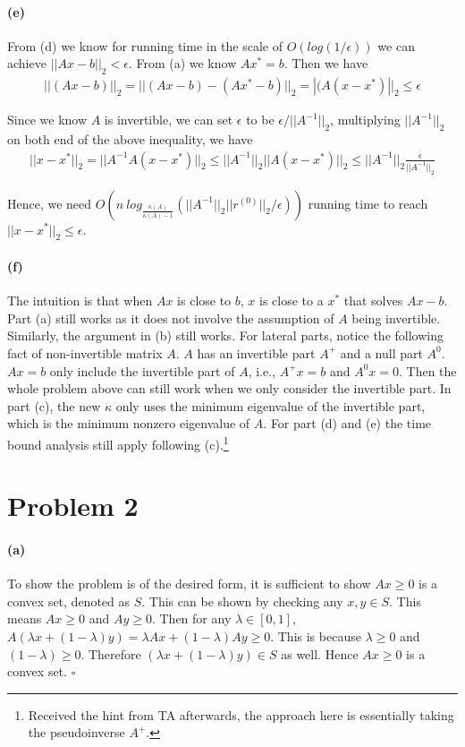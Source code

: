 \documentclass[12pt]{article}
\begin{document}
\paragraph{(e)} From (d) we know for running time in the scale of $O(log(1/\epsilon))$ we can achieve $||Ax -b ||_2 < \epsilon$. From (a) we know $Ax^* = b $. Then we have 
\begin{align*}
||(Ax -b) ||_2 = ||(Ax -b) - (Ax^* -b)||_2 = |(A (x - x^*) ||_2 \leq \epsilon
\end{align*}

Since we know $A$ is invertible, we can set $\epsilon$ to be $\epsilon / ||A^{-1}||_2$, multiplying $||A^{-1}||_2$ on both end of the above inequality, we have 
\begin{align*}
||x - x^* ||_2 = ||A^{-1}A (x - x^*) ||_2 \leq ||A^{-1}||_2 ||A (x - x^*) ||_2 \leq ||A^{-1}||_2 \frac{\epsilon}{||A^{-1}||_2}
\end{align*}

Hence, we need $O(n\:log_{\frac{\kappa(A)}{\kappa(A) - 1}}(||A^{-1}||_2||r^{(0)}||_2/\epsilon))$ running time to reach $||x - x^* ||_2  \leq \epsilon$.

\paragraph{(f)} The intuition is that when $Ax$ is close to $b$, $x$ is close to a $x^*$ that solves $Ax - b$. Part (a) still works as it does not involve the assumption of $A$ being invertible. Similarly, the argument in (b) still works. For lateral parts, notice the following fact of non-invertible matrix $A$. $A$ has an invertible part $A^{+}$ and a null part $A^{0}$. $Ax = b$ only include the invertible part of $A$, i.e., $A^{+}x = b$ and $A^{0}x = 0$. Then the whole problem above can still work when we only consider the invertible part. In part (c), the new $\kappa$ only uses the minimum eigenvalue of the invertible part, which is the minimum nonzero eigenvalue of $A$. For part (d) and (e) the time bound analysis still apply following (c).\footnote{Received the hint from TA afterwards, the approach here is essentially taking the pseudoinverse $A^+$.}

\newpage
\section*{Problem 2}
\paragraph{(a)} To show the problem is of the desired form, it is sufficient to show $Ax \geq 0$ is a convex set, denoted as $S$. This can be shown by checking any $x, y \in S$. This means $Ax \geq 0$ and $Ay \geq 0$. Then for any $\lambda \in [0,1]$, $A (\lambda x + (1-\lambda)y) = \lambda Ax + (1-\lambda)Ay \geq 0.$ This is because $\lambda \geq 0$ and $(1-\lambda) \geq 0$. Therefore $(\lambda x + (1-\lambda)y) \in S$ as well. Hence $Ax\geq 0$ is a convex set. $\square$
\end{document}
